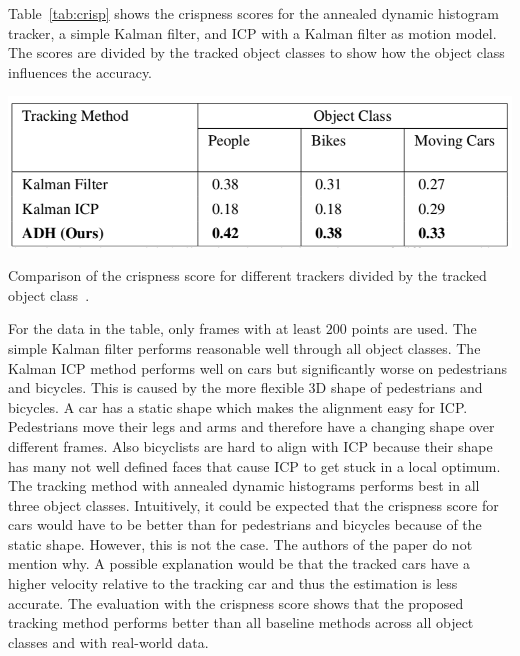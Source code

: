 \documentclass[twoside,a4paper,article]{combine}
\begin{document}
Table~\ref{tab:crisp} shows the crispness scores for the annealed
dynamic histogram tracker, a simple Kalman filter, and ICP with a
Kalman filter as motion model. The scores are divided by the tracked
object classes to show how the object class influences the accuracy.
\begin{table}
  \center
  \includegraphics[width=.8\linewidth]{crispness-scores}
  \caption{Comparison of the crispness score for different trackers
    divided by the tracked object class~\cite{paper}.}
  \label{tab:crisp}
\end{table}
For the data in the table, only frames with at least $200$ points are
used. The simple Kalman filter performs reasonable well through all
object classes. The Kalman ICP method performs well on cars but
significantly worse on pedestrians and bicycles. This is caused by the
more flexible 3D shape of pedestrians and bicycles. A car has a static
shape which makes the alignment easy for ICP. Pedestrians move their
legs and arms and therefore have a changing shape over different
frames. Also bicyclists are hard to align with ICP because their shape
has many not well defined faces that cause ICP to get stuck in a local
optimum. The tracking method with annealed dynamic histograms performs
best in all three object classes. Intuitively, it could be expected
that the crispness score for cars would have to be better than for
pedestrians and bicycles because of the static shape. However, this is
not the case. The authors of the paper do not mention why. A possible
explanation would be that the tracked cars have a higher velocity
relative to the tracking car and thus the estimation is less accurate.
The evaluation with the crispness score shows that the proposed
tracking method performs better than all baseline methods across all
object classes and with real-world data.

\end{document}
